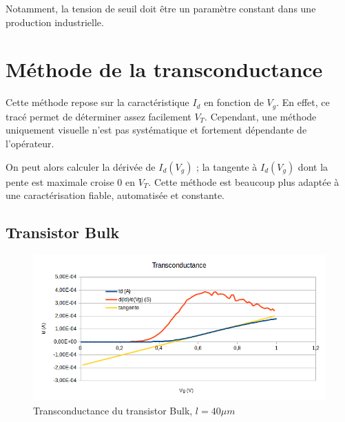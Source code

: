 \documentclass[a4paper,11pt]{report}
\begin{document}
Notamment, la tension de seuil doit être un paramètre constant dans une production industrielle.

\section{Méthode de la transconductance}
Cette méthode repose sur la caractéristique $I_d$ en fonction de $V_g$. En effet, ce tracé permet de déterminer assez facilement $V_T$. Cependant, une méthode uniquement visuelle n'est pas systématique et fortement dépendante de l'opérateur.

On peut alors calculer la dérivée de $I_d(V_g)$ ; la tangente à $I_d(V_g)$ dont la pente est maximale croise 0 en $V_T$. Cette méthode est beaucoup plus adaptée à une caractérisation fiable, automatisée et constante.



\subsection{Transistor Bulk}
\begin{figure}
    \begin{center}
        \includegraphics[width=\textwidth]{Images/Bulk40-Transconductance}
        \caption{Transconductance du transistor Bulk, $l=40\mu m$}
        \label{fig:}
    \end{center}
\end{figure}
\end{document}
